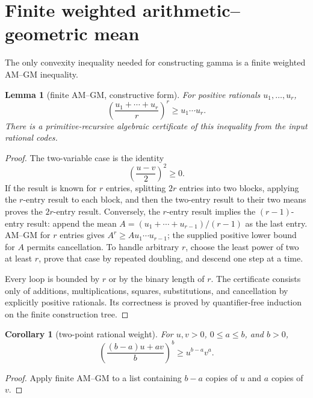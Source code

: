 \documentclass[11pt]{article}
\newtheorem{lemma}[theorem]{Lemma}
\newtheorem{corollary}[theorem]{Corollary}
\begin{document}
\section{Finite weighted arithmetic--geometric mean}
\label{sec:amgm}

The only convexity inequality needed for constructing gamma is a finite
weighted AM--GM inequality.

\begin{lemma}[finite AM--GM, constructive form]
For positive rationals $u_1,\dots,u_r$,
\[
 \left(\frac{u_1+\cdots+u_r}{r}\right)^r
 \ge u_1\cdots u_r.
\]
There is a primitive-recursive algebraic certificate of this inequality from
the input rational codes.
\end{lemma}

\begin{proof}
The two-variable case is the identity
\[
 \left(\frac{u-v}{2}\right)^2\ge0.
\]
If the result is known for $r$ entries, splitting $2r$ entries into two blocks,
applying the $r$-entry result to each block, and then the two-entry result to
their two means proves the $2r$-entry result.  Conversely, the $r$-entry result
implies the $(r-1)$-entry result: append the mean
$A=(u_1+\cdots+u_{r-1})/(r-1)$ as the last entry.  AM--GM for $r$ entries gives
$A^r\ge A u_1\cdots u_{r-1}$; the supplied positive lower bound for $A$ permits
cancellation.  To handle arbitrary $r$, choose the least power of two at least
$r$, prove that case by repeated doubling, and descend one step at a time.

Every loop is bounded by $r$ or by the binary length of $r$.  The certificate
consists only of additions, multiplications, squares, substitutions, and
cancellation by explicitly positive rationals.  Its correctness is proved by
quantifier-free induction on the finite construction tree.
\end{proof}

\begin{corollary}[two-point rational weight]
For $u,v>0$, $0\le a\le b$, and $b>0$,
\begin{equation}
 \left(\frac{(b-a)u+av}{b}\right)^b\ge u^{b-a}v^a.
 \label{eq:weighted-amgm}
\end{equation}
\end{corollary}

\begin{proof}
Apply finite AM--GM to a list containing $b-a$ copies of $u$ and $a$ copies
of $v$.
\end{proof}
\end{document}
